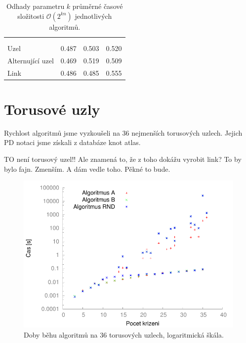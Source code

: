 \begin{table}[b!]

\centering

\begin{tabular}{l@{\hspace{1.5cm}}D{.}{,}{3}D{.}{,}{1.3}D{.}{,}{2.4}} 
\toprule
 & \mc{} & \mc{} & \mc{} \\
\mc{} &  &  &
 \\
\midrule
Uzel     & 0.487 & 0.503& 0.520 \\
Alternující uzel & 0.469 & 0.519 & 0.509 \\
Link   & 0.486 & 0.485 &  0.555\\
\bottomrule
\end{tabular}

\caption{Odhady parametru $k$ průměrné časové složitosti $\mathcal{O}(2^{kn})$ jednotlivých algoritmů.}\label{tab03:algo}

\end{table}


\section{Torusové uzly}
Rychlost algoritmů jsme vyzkoušeli na 36 nejmenších torusových uzlech. Jejich PD notaci jsme získali z databáze knot atlas.

TO není torusový uzel!! Ale znamená to, že z toho dokážu vyrobit link? To by bylo fajn. Zmenším. A dám vedle toho. Pěkné to bude.

\begin{figure}[p]\centering
\includegraphics{../img/torusSrov}
\caption{Doby běhu algoritmů na 36 torusových uzlech, logaritmická škála.}
\label{obr03:torusSrov}
\end{figure}

